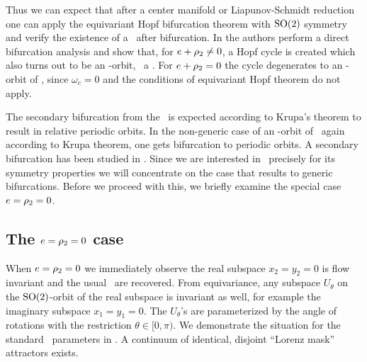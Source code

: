 Thus we can expect that after a center manifold or Liapunov-Schmidt reduction one
can apply the equivariant Hopf bifurcation theorem with $\mathrm{SO}(2)$ symmetry
and verify the existence of a \reqv\ after bifurcation. In  the authors perform a direct bifurcation analysis and
show that, for $e+\rho_2\neq 0$, a Hopf cycle  is created which also turns out to be an -orbit,
\ie\ a \reqv. For $e+\rho_2=0$ the cycle degenerates to an -orbit of \eqva,
since $\omega_c =0$ and the conditions of equivariant Hopf theorem do not apply.

The secondary bifurcation from the \reqv\ is expected according
to Krupa's theorem to result in
relative periodic orbits. In the non-generic case of an
-orbit of \eqva\, again according to
Krupa theorem, one gets bifurcation
to periodic orbits. A secondary bifurcation has been
studied in .
Since we are interested in \CLe\
precisely for its symmetry properties we will concentrate on the
case that results to generic bifurcations. Before we proceed
with this, we briefly examine the special case $e=\rho_2=0$.


\subsection{The $e=\rho_2=0$ case}

When $e=\rho_2=0$ we immediately observe the real subspace $x_2=y_2=0$ is flow invariant
and the usual \Le\ are recovered. From equivariance, any subspace $U_\theta$ on the $\mathrm{SO}(2)$-orbit of the real
subspace is invariant as well, for example the imaginary subspace $x_1=y_1=0$. The
$U_\theta$'s are  parameterized by the angle of \SOn{2} rotations with
the restriction $\theta\in[0,\pi)$. We demonstrate the situation for the standard \Le\ parameters
in \reffig{fig:LorenzCoex}. A continuum of identical, disjoint ``Lorenz mask'' attractors exists.

